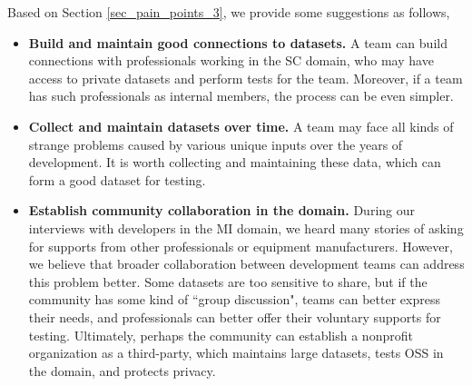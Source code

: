 Based on Section \ref{sec_pain_points_3}, we provide some suggestions as follows,
\begin{itemize}
\item \textbf{Build and maintain good connections to datasets.} A team can build connections with professionals working in the SC domain, who may have access to private datasets and perform tests for the team. Moreover, if a team has such professionals as internal members, the process can be even simpler.

\item \textbf{Collect and maintain datasets over time.} A team may face all kinds of strange problems caused by various unique inputs over the years of development. It is worth collecting and maintaining these data, which can form a good dataset for testing.

\item \textbf{Establish community collaboration in the domain.} During our interviews with developers in the MI domain, we heard many stories of asking for supports from other professionals or equipment manufacturers. However, we believe that broader collaboration between development teams can address this problem better. Some datasets are too sensitive to share, but if the community has some kind of ``group discussion", teams can better express their needs, and professionals can better offer their voluntary supports for testing. Ultimately, perhaps the community can establish a nonprofit organization as a third-party, which maintains large datasets, tests OSS in the domain, and protects privacy.
\end{itemize}
